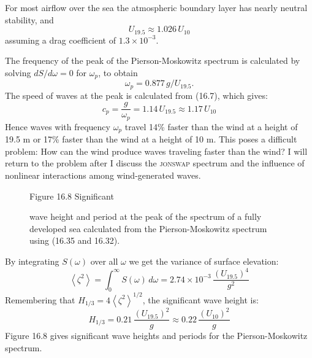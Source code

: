 For most airflow over the sea the atmospheric boundary layer has nearly neutral
stability, and
\begin{equation}
U_{19.5}\approx 1.026\, U_{10}
\end{equation}
assuming a drag coefficient of $1.3 \times 10^{-3}$.

The frequency of the peak of the Pierson-Moskowitz spectrum is calculated
by solving
$dS/d\omega = 0$ for $\omega _{p}$, to obtain
\begin{equation}
\omega _{p} = 0.877 \,g/U_{19.5}.
\end{equation}
The speed of waves at the peak is calculated from (16.7), which gives:
\begin{equation}
c_{p} = \frac{g}{\omega _{p}} = 1.14 \, U_{19.5} \approx 1.17\,U_{10}
\end{equation}
Hence waves with frequency $\omega _{p}$ travel 14\% faster than the wind at a height of 19.5 m or 17\% faster than the wind at a height of 10 m. This poses a difficult problem: How can the wind produce waves traveling faster than the wind? I will return to the problem after I discuss the \textsc{jonswap}
spectrum and the influence of nonlinear interactions among wind-generated waves.

\begin{figure}[b!]
\vspace{-2ex}
\footnotesize
\centering
Figure 16.8 Significant \rule{0mm}{3ex}wave height and period at the peak of the
spectrum of a fully developed sea calculated from the Pierson-Moskowitz spectrum
using (16.35 and 16.32).

\label{fig:wavehtperiod}
\end{figure}

By integrating $S(\omega)$ over all $\omega$ we get the variance of surface elevation:
\begin{equation}
\left<\zeta ^{2}\right> = \int_{0}^{\infty} S(\omega )\, d \omega = 2.74 \times
10^{-3}
\,\frac{\left(U_{19.5}
\right)^4}{g^2}
\end{equation}
Remembering that $H_{1/3} = 4 \left<\zeta ^{2}\right>^{1/2}$, the significant wave
height is:
\begin{equation}
H_{1/3} = 0.21 \, \frac{\left(U_{19.5} \right)^2}{g}\approx 0.22 \,
\frac{\left(U_{10} \right)^2}{g}
\end{equation}
Figure 16.8 gives significant wave heights and periods for the Pierson-Moskowitz spectrum.


